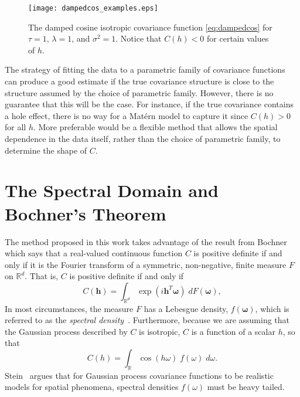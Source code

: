 \begin{figure}[!htb]
	\centering
	\texttt{[image: dampedcos\_examples.eps]}
	\caption{\small The damped cosine isotropic covariance function \eqref{eq:dampedcos} for $\tau = 1$, $\lambda = 1$, and $\sigma^2=1$. Notice that $C(h) < 0$ for certain values of $h$.}
	\label{fig:dampedcos_examples}
\end{figure}

The strategy of fitting the data to a parametric family of covariance functions can produce a good estimate if the true covariance structure is close to the structure assumed by the choice of parametric family. However, there is no guarantee that this will be the case. For instance, if the true covariance contains a hole effect, there is no way for a Mat\'ern model to capture it since $C(h) > 0$ for all $h$. More preferable would be a flexible method that allows the spatial dependence in the data itself, rather than the choice of parametric family, to determine the shape of $C$.


\section{The Spectral Domain and Bochner's Theorem} %
\label{sec:bochner_s_theorem}

The method proposed in this work takes advantage of the result from Bochner~\cite{bochner1955harmonic} which says that a real-valued continuous function $C$ is positive definite if and only if it is the Fourier transform of a symmetric, non-negative, finite measure $F$ on $\mathbb{R}^d$. That is, $C$ is positive definite if and only if
\begin{equation} \label{eq:bochner}
C(\bm{h}) = \int_{\mathbb{R}^d} \exp(i \bm{h}^T \bm{\omega}) \; dF(\bm{\omega}),
\end{equation}
In most circumstances, the measure $F$ has a Lebesgue density, $f(\bm{\omega})$, which is referred to as the \emph{spectral density}~\cite{gelfand2010handbook}.  Furthermore, because we are assuming that the Gaussian process described by $C$ is isotropic, $C$ is a function of a scalar $h$, so that
\begin{equation} \label{eq:bochner2}
C(h) = \int_{\mathbb{R}} \cos(h\omega) \; f(\omega) \; d\omega.
\end{equation}
Stein~\cite{Stein1999} argues that for Gaussian process covariance functions to be realistic models for spatial phenomena, spectral densities $f(\omega)$ must be heavy tailed.


